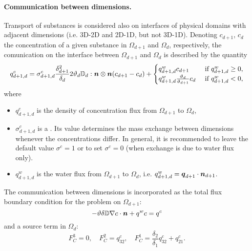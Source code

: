 \paragraph{Communication between dimensions.}
Transport of substances is considered also on interfaces of physical domains with adjacent dimensions (i.e. 3D-2D and 2D-1D, but not 3D-1D).
Denoting $c_{d+1}$, $c_d$ the concentration of a given substance in $\Omega_{d+1}$ and $\Omega_d$, respectively, the comunication on the interface between $\Omega_{d+1}$ and $\Omega_d$ is described by the quantity
\begin{equation}
  \label{e:inter_dim_flux}
  q^c_{d+1,d} = \sigma^c_{d+1,d} \frac{\delta_{d+1}^2}{\delta_d}2\th_d\D_d:\n\otimes\n ( c_{d+1} - c_d) + \begin{cases}q^w_{d+1,d} c_{d+1} & \mbox{ if }q^w_{d+1,d}\ge 0,\\q^w_{d+1,d} \frac{\th_d}{\th_{d+1}} c_d & \mbox{ if }q^w_{d+1,d}<0,\end{cases}
\end{equation}
where
\begin{itemize}
\item $q^c_{d+1,d}$  is the density of concentration flux from $\Omega_{d+1}$ to $\Omega_d$,
\item $\sigma^c_{d+1,d}$ \units{}{}{} is a .
Its value determines the mass exchange between dimensions whenever the concentrations differ.
In general, it is recommended to leave the default value $\sigma^c=1$ or to set $\sigma^c=0$ (when exchange is due to water flux only).
\item $q^w_{d+1,d}$  is the water flux from $\Omega_{d+1}$ to $\Omega_d$, i.e. $q^w_{d+1,d} = \mathbf{\boldsymbol{q}}_{d+1}\cdot\mathbf{\boldsymbol{n}}_{d+1}$.
\end{itemize}
The communication between dimensions is incorporated as the total flux boundary condition for the problem on $\Omega_{d+1}$:
\begin{equation}
\label{e:FC}
-\th\delta\D\nabla c\cdot\vc n + q^w c = q^c
\end{equation}
and a source term in $\Omega_d$:
\begin{equation}
F_C^3 = 0,\quad
F_C^2 = q^c_{32},\quad
F_C^1 = \frac{\delta_2}{\delta_1}q^c_{32} + q^c_{21}.
\end{equation}



